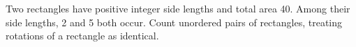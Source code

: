 Two rectangles have positive integer side lengths and total area 40. Among their side lengths, 2 and 5 both occur. Count unordered pairs of rectangles, treating rotations of a rectangle as identical.

